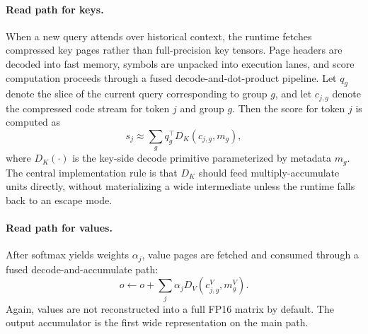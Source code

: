 \documentclass[11pt]{article}
\begin{document}
\paragraph{Read path for keys.} When a new query attends over historical context, the runtime fetches compressed key pages rather than full-precision key tensors. Page headers are decoded into fast memory, symbols are unpacked into execution lanes, and score computation proceeds through a fused decode-and-dot-product pipeline. Let $q_g$ denote the slice of the current query corresponding to group $g$, and let $c_{j,g}$ denote the compressed code stream for token $j$ and group $g$. Then the score for token $j$ is computed as
\[
 s_j \approx \sum_g q_g^\top D_K(c_{j,g}, m_g),
\]
where $D_K(\cdot)$ is the key-side decode primitive parameterized by metadata $m_g$. The central implementation rule is that $D_K$ should feed multiply-accumulate units directly, without materializing a wide intermediate unless the runtime falls back to an escape mode.

\paragraph{Read path for values.} After softmax yields weights $\alpha_j$, value pages are fetched and consumed through a fused decode-and-accumulate path:
\[
 o \leftarrow o + \sum_j \alpha_j D_V(c^{V}_{j,g}, m^{V}_g).
\]
Again, values are not reconstructed into a full FP16 matrix by default. The output accumulator is the first wide representation on the main path.
\end{document}
